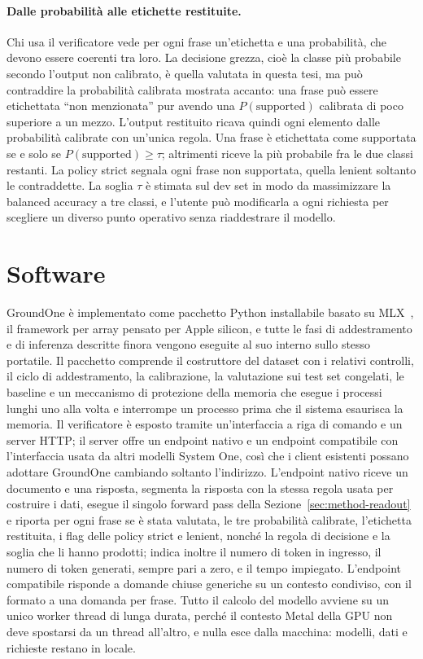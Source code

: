 \paragraph{Dalle probabilità alle etichette restituite.} Chi usa il verificatore vede per ogni frase un'etichetta e una
probabilità, che devono essere coerenti tra loro. La decisione grezza, cioè la classe più probabile secondo l'output non
calibrato, è quella valutata in questa tesi, ma può contraddire la probabilità calibrata mostrata accanto: una frase può
essere etichettata ``non menzionata'' pur avendo una $P(\text{supported})$ calibrata di poco superiore a un mezzo.
L'output restituito ricava quindi ogni elemento dalle probabilità calibrate con un'unica regola. Una frase è etichettata
come supportata se e solo se $P(\text{supported}) \geq \tau$; altrimenti riceve la più probabile fra le due classi
restanti. La policy strict segnala ogni frase non supportata, quella lenient soltanto le contraddette. La soglia $\tau$
è stimata sul dev set in modo da massimizzare la balanced accuracy a tre classi, e l'utente può modificarla a ogni
richiesta per scegliere un diverso punto operativo senza riaddestrare il modello.

\section{Software}
\label{sec:method-software}

GroundOne è implementato come pacchetto Python installabile basato su MLX~\cite{mlx2023,mlxlm}, il framework per array
pensato per Apple silicon, e tutte le fasi di addestramento e di inferenza descritte finora vengono eseguite al suo
interno sullo stesso portatile. Il pacchetto comprende il costruttore del dataset con i relativi controlli, il ciclo di
addestramento, la calibrazione, la valutazione sui test set congelati, le baseline e un meccanismo di protezione della
memoria che esegue i processi lunghi uno alla volta e interrompe un processo prima che il sistema esaurisca la memoria.
Il verificatore è esposto tramite un'interfaccia a riga di comando e un server HTTP; il server offre un endpoint
nativo e un endpoint compatibile con l'interfaccia usata da altri modelli System One, così che i client esistenti
possano adottare GroundOne cambiando soltanto l'indirizzo. L'endpoint nativo riceve un documento e una risposta,
segmenta la risposta con la stessa regola usata per costruire i dati, esegue il singolo forward pass della
Sezione~\ref{sec:method-readout} e riporta per ogni frase se è stata valutata, le tre probabilità calibrate,
l'etichetta restituita, i flag delle policy strict e lenient, nonché la regola di decisione e la soglia che li hanno
prodotti; indica inoltre il numero di token in ingresso, il numero di token generati, sempre pari a zero, e il tempo
impiegato. L'endpoint compatibile risponde a domande chiuse generiche su un contesto condiviso, con il formato a una
domanda per frase. Tutto il calcolo del modello avviene su un unico worker thread di lunga durata, perché il contesto
Metal della GPU non deve spostarsi da un thread all'altro, e nulla esce dalla macchina: modelli, dati e richieste
restano in locale.
